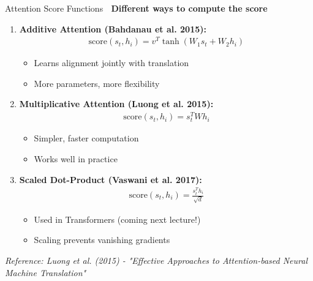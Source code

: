 \documentclass[aspectratio=169]{beamer}
\begin{document}
\begin{frame}[shrink=10]{Attention Score Functions 📐}
\textbf{Different ways to compute the score}

\vspace{1em}

\begin{enumerate}\setlength{\itemsep}{0pt}
    \item \textbf{Additive Attention (Bahdanau et al. 2015):}
    \begin{align*}
    \text{score}(s_t, h_i) = v^T \tanh(W_1 s_t + W_2 h_i)
    \end{align*}
    \begin{itemize}\setlength{\itemsep}{0pt}
        \item Learns alignment jointly with translation
        \item More parameters, more flexibility
    \end{itemize}

    \vspace{0.5em}

    \item \textbf{Multiplicative Attention (Luong et al. 2015):}
    \begin{align*}
    \text{score}(s_t, h_i) = s_t^T W h_i
    \end{align*}
    \begin{itemize}\setlength{\itemsep}{0pt}
        \item Simpler, faster computation
        \item Works well in practice
    \end{itemize}

    \vspace{0.5em}

    \item \textbf{Scaled Dot-Product (Vaswani et al. 2017):}
    \begin{align*}
    \text{score}(s_t, h_i) = \frac{s_t^T h_i}{\sqrt{d}}
    \end{align*}
    \begin{itemize}\setlength{\itemsep}{0pt}
        \item Used in Transformers (coming next lecture!)
        \item Scaling prevents vanishing gradients
    \end{itemize}
\end{enumerate}

\small
\textit{Reference: Luong et al. (2015) - "Effective Approaches to Attention-based Neural Machine Translation"}
\end{frame}
\end{document}

